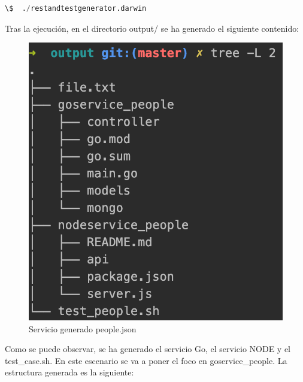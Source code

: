 \documentclass[a4paper,11pt]{book}
\begin{document}
\begin{lstlisting}[language=python,caption={ Ejemplo Entrada Generador: people.json }]
\$  ./restandtestgenerator.darwin 
\end{lstlisting} 

Tras la ejecución, en el directorio output/ se ha generado el siguiente contenido:

\begin{figure}[H]  
\centering 
\includegraphics[scale=0.35]{imagenes/t11.png}
\caption{ Servicio generado people.json}  
\end{figure}

Como se puede observar, se ha generado el servicio Go, el servicio NODE y el test\_case.sh. En este escenario se va a poner el foco en goservice\_people. La estructura generada es la siguiente:
\end{document}
